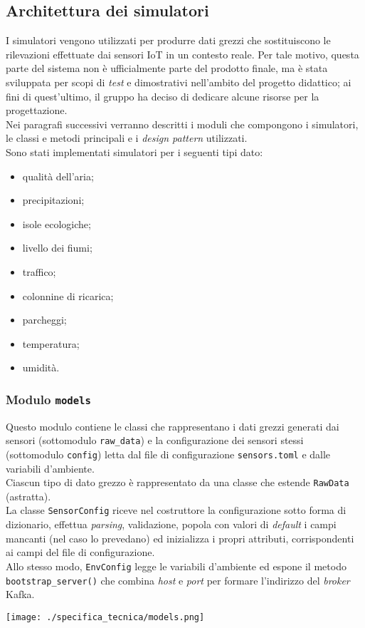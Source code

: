 \subsection{Architettura dei simulatori}
I simulatori vengono utilizzati per produrre dati grezzi che sostituiscono le rilevazioni effettuate dai sensori IoT in un contesto reale.
Per tale motivo, questa parte del sistema non è ufficialmente parte del prodotto finale, ma è stata sviluppata per scopi di \textit{test}
e dimostrativi nell'ambito del progetto didattico; ai fini di quest'ultimo, il gruppo ha deciso di dedicare alcune risorse per la progettazione.\\
Nei paragrafi successivi verranno descritti i moduli che compongono i simulatori, le classi e metodi principali e i \textit{design pattern} utilizzati.\\
Sono stati implementati simulatori per i seguenti tipi dato:
\begin{itemize}
	\item qualità dell'aria;
	\item precipitazioni;
	\item isole ecologiche;
	\item livello dei fiumi;
	\item traffico;
	\item colonnine di ricarica;
	\item parcheggi;
	\item temperatura;
	\item umidità.
\end{itemize}

\subsubsection{Modulo \texttt{models}}
Questo modulo contiene le classi che rappresentano i dati grezzi generati dai sensori (sottomodulo \texttt{raw\_data}) e la configurazione dei sensori stessi (sottomodulo \texttt{config}) letta
dal file di configurazione \texttt{sensors.toml} e dalle variabili d'ambiente.\\
Ciascun tipo di dato grezzo è rappresentato da una classe che estende \texttt{RawData} (astratta).\\
La classe \texttt{SensorConfig} riceve nel costruttore la configurazione sotto forma di dizionario, effettua \textit{parsing}, validazione,
popola con valori di \textit{default} i campi mancanti (nel caso lo prevedano) ed inizializza i propri attributi, corrispondenti ai campi del file di configurazione.\\
Allo stesso modo, \texttt{EnvConfig} legge le variabili d'ambiente ed espone il metodo \texttt{bootstrap\_server()} che combina \textit{host} e \textit{port} per formare l'indirizzo del \textit{broker} Kafka.\\
\begin{center}
	\texttt{[image: ./specifica\_tecnica/models.png]}
\end{center}

